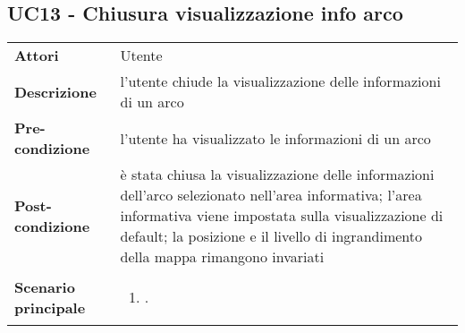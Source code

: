 \subsection{UC13 - Chiusura visualizzazione info arco} 
\label{sssec:UC13} 
\def\arraystretch{1.5}
\begin{tabularx}{\textwidth}{l|p{}}
	\rowcolor{I} \multicolumn{2}{c}{\color{white}\textbf{UC13 - Chiusura visualizzazione info arco}} \\
	\toprule
	\endhead
	\textbf{Attori} & Utente\\
	\textbf{Descrizione} & l'utente chiude la visualizzazione delle informazioni di un arco\\
	\textbf{Pre-condizione} & l'utente ha visualizzato le informazioni di un arco\\
	\textbf{Post-condizione} & è stata chiusa la visualizzazione delle informazioni dell'arco selezionato nell'area informativa; l'area informativa viene impostata sulla visualizzazione di default; la posizione e il livello di ingrandimento della mappa rimangono invariati\\
	\textbf{Scenario principale} & \vspace{-1.2em}\begin{enumerate}[leftmargin=*,noitemsep,nosep]
		\item \nameref{sssec:UC13}.
	\end{enumerate}\\
	\bottomrule
\end{tabularx}
